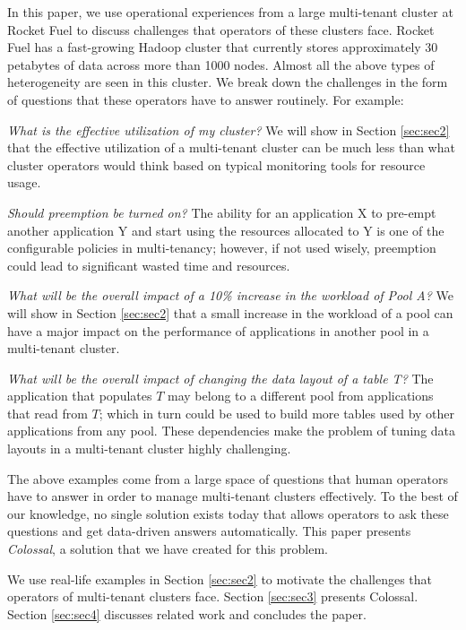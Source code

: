 In this paper, we use operational experiences from a large multi-tenant cluster at Rocket Fuel to discuss challenges that operators of these clusters face. Rocket Fuel has a fast-growing Hadoop cluster that currently stores approximately 30 petabytes of data across more than 1000 nodes. Almost all the above types of heterogeneity are seen in this cluster. We break down the challenges in the form of questions that these operators have to answer routinely.  For example:

\squishlist

\item {\em What is the effective utilization of my cluster?} 
We will show in Section \ref{sec:sec2} that the effective utilization of a multi-tenant cluster can be much less than what cluster operators would think based on typical monitoring tools for resource usage.  

\item {\em Should preemption be turned on?} 
The ability for an application X to pre-empt another application Y and start using the resources allocated to Y is one of the configurable policies in multi-tenancy; however, if not used wisely, preemption could lead to significant wasted time and resources.

\item {\em What will be the overall impact of a 10\% increase
in the workload of Pool A?}  
We will show in Section \ref{sec:sec2} that a small increase in the workload of a pool can have a major impact on the performance of applications in another pool in a multi-tenant cluster.

\item {\em What will be the overall impact of changing the data layout
of a table T?}  The application that populates $T$ may belong to a different pool from applications that read from $T$; which in turn could be used to build more tables used by other applications from any pool. These dependencies make the problem of tuning data layouts in a multi-tenant cluster highly challenging.

\squishend

The above examples come from a large space of questions that human operators have to answer in order to manage multi-tenant clusters effectively. To the best of our knowledge, no single solution exists today that allows operators to ask these questions and get data-driven answers automatically. This paper presents {\em Colossal}, a solution that we have created for this 
problem.

We use real-life examples in Section \ref{sec:sec2} to motivate the challenges that operators of multi-tenant clusters face. Section \ref{sec:sec3} presents Colossal. Section \ref{sec:sec4} discusses related work
and concludes the paper.
